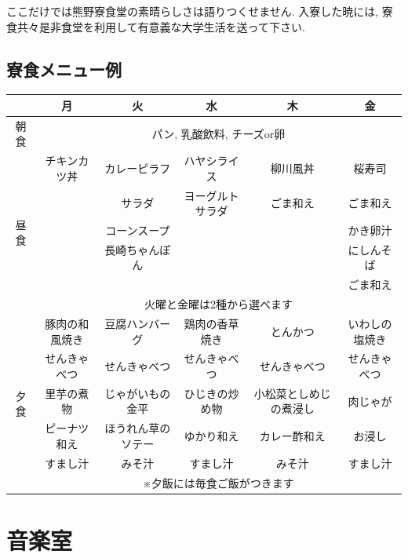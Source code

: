 \documentclass[10pt,b5jsbook,dvips,dvipdfmx,openany]{jsbook}
\theoremstyle{definition}
\begin{document}
		ここだけでは熊野寮食堂の素晴らしさは語りつくせません. 入寮した暁には, 寮食共々是非食堂を利用して有意義な大学生活を送って下さい. 

		\subsection{寮食メニュー例}

\begin{table}[htb]
\begin{tabular}{|c|c|c|c|c|c|} \hline 
&月&火&水&木&金 \\ \hline \hline
朝食& \multicolumn{5}{|c|}{パン, 乳酸飲料, チーズor卵} \\  \hline \hline
\multirow{6}{*}{昼食} & チキンカツ丼 &カレーピラフ & ハヤシライス & 柳川風丼 & 桜寿司 \\ 
&&サラダ	&ヨーグルトサラダ&ごま和え&ごま和え \\ 
&&コーンスープ&&&かき卵汁 \\  \cline{2-6}
&&長崎ちゃんぽん&&&にしんそば \\
&&&&&ごま和え \\  \cline{2-6}
&\multicolumn{5}{|c|}{火曜と金曜は2種から選べます} \\  \hline \hline
\multirow{6}{*}{夕食}&豚肉の和風焼き& 豆腐ハンバーグ& 鶏肉の香草焼き& とんかつ& いわしの塩焼き \\ 
&せんきゃべつ&せんきゃべつ&せんきゃべつ&せんきゃべつ& せんきゃべつ \\ 
&里芋の煮物& じゃがいもの金平& ひじきの炒め物	& 小松菜としめじの煮浸し& 肉じゃが \\ 
&ピーナツ和え& ほうれん草のソテー& ゆかり和え& カレー酢和え& お浸し\\ 
&すまし汁& みそ汁& すまし汁& みそ汁& すまし汁 \\ \cline{2-6}
&\multicolumn{5}{|c|}{※夕飯には毎食ご飯がつきます} \\ \hline
\end{tabular}
\end{table}


\newpage

	\section{音楽室} \label{sec:MUC}
	
	
\end{document}
